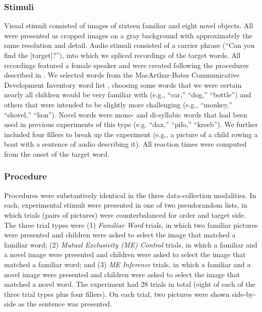 \documentclass[man,noapacite]{apa2}
\begin{document}
\subsubsection{Stimuli}

Visual stimuli consisted of images of sixteen familiar and eight novel objects. All were presented as cropped images on a gray background with approximately the same resolution and detail.  Audio stimuli consisted of a carrier phrase (``Can you find the [target]?''), into which we spliced recordings of the target words. All recordings featured a female speaker and were created following the procedures described in . We selected words from the MacArthur-Bates Communicative Development Inventory word list \cite{fenson1994,fenson2007}, choosing some words that we were certain nearly all children would be very familiar with (e.g., ``car,'' ``dog,'' ``bottle'') and others that were intended to be slightly more challenging (e.g., ``monkey,'' ``shovel,'' ``lion''). Novel words were mono- and di-syllabic words that had been used in previous experiments of this type (e.g. ``dax,'' ``pifo,'' ``kreeb''). We further included four fillers to break up the experiment (e.g., a picture of a child rowing a boat with a sentence of audio describing it). All reaction times were computed from the onset of the target word. 

\subsubsection{Procedure}

Procedures were substantively identical in the three data-collection modalities. In each, experimental stimuli were presented in one of two pseudorandom lists, in which trials (pairs of pictures) were counterbalanced for order and target side. The three trial types were (1) \emph{Familiar Word} trials, in which two familiar pictures were presented and children were asked to select the image that matched a familiar word; (2) \emph{Mutual Exclusivity (ME) Control} trials, in which a familiar and a novel image were presented and children were asked to select the image that matched a familiar word; and (3) \emph{ME Inference} trials, in which a familiar and a novel image were presented and children were asked to select the image that matched a novel word. The experiment had 28 trials in total (eight of each of the three trial types plus four fillers). On each trial, two pictures were shown side-by-side as the sentence was presented.
\end{document}
